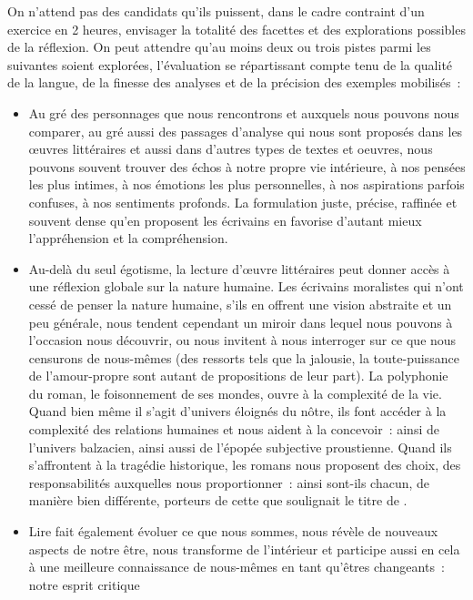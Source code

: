 {On n'attend pas des candidats qu'ils puissent, dans le cadre contraint d'un exercice en 2
heures, envisager la totalité des facettes et des explorations possibles de la réflexion. On peut
attendre qu'au moins deux ou trois pistes parmi les suivantes soient explorées, l'évaluation se
répartissant compte tenu de la qualité de la langue, de la finesse des analyses et de la
précision des exemples mobilisés~:

\begin{itemize}
\item Au gré des personnages que nous rencontrons et auxquels nous pouvons nous
comparer, au gré aussi des passages d'analyse qui nous sont proposés dans les
œuvres littéraires et aussi dans d'autres types de textes et oeuvres, nous pouvons
souvent trouver des échos à notre propre vie intérieure, à nos pensées les plus intimes,
à nos émotions les plus personnelles, à nos aspirations parfois confuses, à nos
sentiments profonds. La formulation juste, précise, raffinée et souvent dense qu'en
proposent les écrivains en favorise d'autant mieux l'appréhension et la compréhension.
\item Au-delà du seul égotisme, la lecture d'œuvre littéraires peut donner accès à une
réflexion globale sur la nature humaine. Les écrivains moralistes qui n'ont cessé de
penser la nature humaine, s'ils en offrent une vision abstraite et un peu générale, nous
tendent cependant un miroir dans lequel nous pouvons à l'occasion nous découvrir, ou
nous invitent à nous interroger sur ce que nous censurons de nous-mêmes (des
ressorts tels que la jalousie, la toute-puissance de l'amour-propre sont autant de
propositions de leur part). La polyphonie du roman, le foisonnement de ses mondes,
ouvre à la complexité de la vie. Quand bien même il s'agit d'univers éloignés du nôtre,
ils font accéder à la complexité des relations humaines et nous aident à la concevoir~:
ainsi de l'univers balzacien, ainsi aussi de l'épopée subjective proustienne. Quand ils
s'affrontent à la tragédie historique, les romans nous proposent des choix, des
responsabilités auxquelles nous proportionner~: ainsi sont-ils chacun, de manière bien
différente, porteurs de cette  que soulignait le titre de .
\item Lire fait également évoluer ce que nous sommes, nous révèle de nouveaux aspects de
notre être, nous transforme de l'intérieur et participe aussi en cela à une meilleure
connaissance de nous-mêmes en tant qu'êtres changeants~: notre esprit critique

\end{itemize}}
